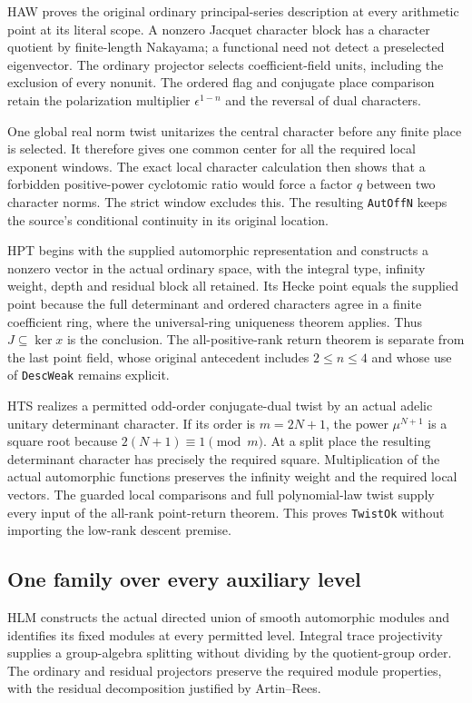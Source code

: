 HAW proves the original ordinary principal-series description at
every arithmetic point at its literal scope.  A nonzero Jacquet
character block has a character quotient by finite-length
Nakayama; a functional need not detect a preselected eigenvector.
The ordinary projector selects coefficient-field units, including
the exclusion of every nonunit.  The ordered flag and conjugate
place comparison retain the polarization multiplier
$\epsilon^{1-n}$ and the reversal of dual characters.

One global real norm twist unitarizes the central character before
any finite place is selected.  It therefore gives one common center
for all the required local exponent windows.  The exact local
character calculation then shows that a forbidden positive-power
cyclotomic ratio would force a factor $q$ between two character
norms.  The strict window excludes this.  The resulting
\texttt{AutOffN} keeps the source's conditional continuity in
its original location.

HPT begins with the supplied automorphic representation and
constructs a nonzero vector in the actual ordinary space, with
the integral type, infinity weight, depth and residual block all
retained.  Its Hecke point equals the supplied point because the
full determinant and ordered characters agree in a finite
coefficient ring, where the universal-ring uniqueness theorem
applies.  Thus $J\subseteq\ker x$ is the conclusion.  The
all-positive-rank return theorem is separate from the last point
field, whose original antecedent includes $2\le n\le4$ and
whose use of \texttt{DescWeak} remains explicit.

HTS realizes a permitted odd-order conjugate-dual twist by an
actual adelic unitary determinant character.  If its order is
$m=2N+1$, the power $\mu^{N+1}$ is a square root because
$2(N+1)\equiv1\pmod m$.  At a split place the resulting
determinant character has precisely the required square.
Multiplication of the actual automorphic functions preserves the
infinity weight and the required local vectors.  The guarded
local comparisons and full polynomial-law twist supply every
input of the all-rank point-return theorem.  This proves
\texttt{TwistOk} without importing the low-rank descent premise.

\subsection{One family over every auxiliary level}

HLM constructs the actual directed union of smooth automorphic
modules and identifies its fixed modules at every permitted
level.  Integral trace projectivity supplies a group-algebra
splitting without dividing by the quotient-group order.  The
ordinary and residual projectors preserve the required module
properties, with the residual decomposition justified by
Artin--Rees.

